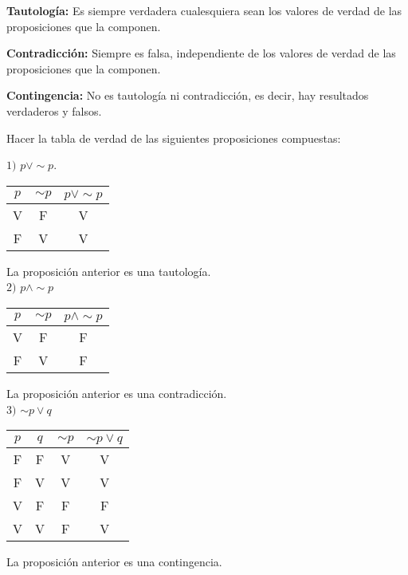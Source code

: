 \begin{mydef}
\textbf{Tautología:} Es siempre verdadera cualesquiera sean los valores de verdad de las proposiciones que la componen.
\end{mydef}

\begin{mydef}
\textbf{Contradicción:} Siempre es falsa, independiente de los valores de verdad de las proposiciones que la componen.
\end{mydef}

\begin{mydef}
\textbf{Contingencia:} No es tautología ni contradicción, es decir, hay resultados verdaderos y falsos.
\end{mydef}

\newpage
\begin{myexample}
Hacer la tabla de verdad de las siguientes proposiciones compuestas:
\end{myexample}
$1)$ $p\vee\sim p$.\\
\begin{center}
	\begin{tabular}{|c|c|c|}
\hline
$p$&$\sim p$&$p\vee\sim p$\\
\hline
V&F&V\\
\hline
F&V&V\\
\hline
	\end{tabular}
\end{center}
La proposición anterior es una tautología.\\

$2)$ $p\wedge \sim p$\\
\begin{center}
	\begin{tabular}{|c|c|c|}
\hline
$p$&$\sim p$& $p\wedge \sim p$\\
\hline
V&F&F\\
\hline
F&V&F\\
\hline
	\end{tabular}
\end{center}
La proposición anterior es una contradicción.\\

$3)$ $\sim p\vee q$
\begin{center}
	\begin{tabular}{|c|c|c|c|}
\hline
$p$&$q$&$\sim p$& $\sim p\vee q$\\
\hline
F&F&V&V\\
\hline
F&V&V&V\\
\hline
V&F&F&F\\
\hline
V&V&F&V\\
\hline
	\end{tabular}
\end{center}
La proposición anterior es una contingencia.\\

